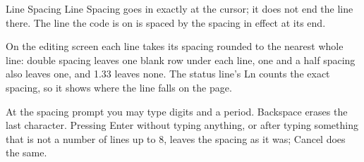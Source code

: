 \begin{Feature}{Line Spacing}
Line Spacing goes in exactly at the cursor; it does not end the line there.
The line the code is on is spaced by the spacing in effect at its end.

On the editing screen each line takes its spacing rounded to the nearest
whole line: double spacing leaves one blank row under each line, one and a
half spacing also leaves one, and 1.33 leaves none.  The status line's Ln
counts the exact spacing, so it shows where the line falls on the page.

At the spacing prompt you may type digits and a period.  Backspace erases
the last character.  Pressing Enter without typing anything, or after typing
something that is not a number of lines up to 8, leaves the spacing as it
was; Cancel does the same.

\end{Feature}

